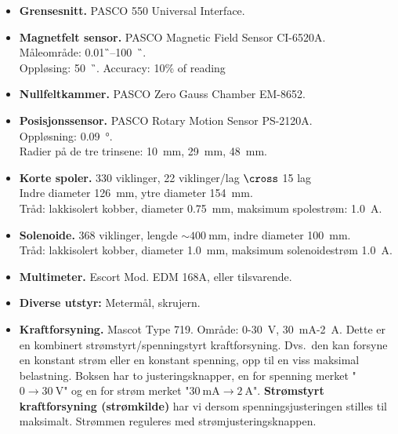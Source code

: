 \documentclass[../Elmag-labhefte-2020.tex]{subfiles}
\begin{document}
\begin{itemize}
    \item \textbf{Grensesnitt.} PASCO 550 Universal Interface.
    \item \textbf{Magnetfelt sensor.} PASCO Magnetic Field Sensor CI-6520A.\\
    Måleområde: \SI{0,01}{\G}--\SI{100}{\kilo\G}.\\
    Oppløsing: \SI{50}{\milli\G}.
    Accuracy: 10\% of reading
    \item \textbf{Nullfeltkammer.} PASCO Zero Gauss Chamber EM-8652. 
    \item \textbf{Posisjonssensor.} PASCO Rotary Motion Sensor PS-2120A. \\
    Oppløsning: \SI{0,09}{\degree}. \\
    Radier på de tre trinsene: \SI{10}{\mm}, \SI{29}{\mm}, \SI{48}{\mm}.
    \item \textbf{Korte spoler.} 330 viklinger, 22 viklinger/lag $\cross$ 15 lag\\
    Indre diameter \SI{126}{\mm}, ytre diameter \SI{154}{\mm}.\\
    Tråd: lakkisolert kobber, diameter \SI{0,75}{\mm}, maksimum spolestrøm: \SI{1,0}{\ampere}. 
    \item \textbf{Solenoide.} 368 viklinger, lengde $\sim \SI{400}{\mm}$, indre diameter \SI{100}{\mm}.\\
    Tråd: lakkisolert kobber, diameter \SI{1,0}{\mm}, maksimum solenoidestrøm \SI{1,0}{\ampere}. 
    \item \textbf{Multimeter.} Escort Mod. EDM 168A, eller tilsvarende. 
    \item \textbf{Diverse utstyr:} Metermål, skrujern. 
    \item \textbf{Kraftforsyning.} Mascot Type 719. Område: 0-\SI{30}{\volt}, \SI{30}{\milli\ampere}-\SI{2}{\ampere}. \label{magnetfelt.kraftforsyning}
    Dette er en kombinert strømstyrt/spenningstyrt kraftforsyning. Dvs.\ den kan forsyne en konstant strøm eller en konstant spenning, opp til en viss maksimal belastning. Boksen har to justeringsknapper, en for spenning merket "$0 \rightarrow \SI{30}{\volt}$" og en for strøm merket "$\SI{30}{\milli\ampere} \rightarrow \SI{2}{\ampere}$".
    \textbf{Strømstyrt kraftforsyning (strømkilde)} har vi dersom spenningsjusteringen stilles til maksimalt. Strømmen reguleres med strømjusteringsknappen. 

\end{itemize}
\end{document}
